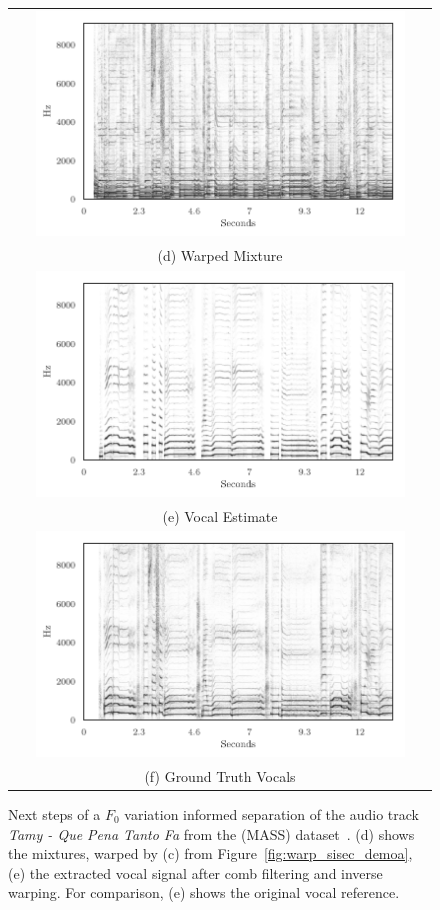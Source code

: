 \begin{figure}
  \centering
\begin{tabular}{c}
  \includegraphics[width=0.9\textwidth]{Chapters/05_Separation_Known/warp-demo/warped.pdf} \\
(d) Warped Mixture \\[6pt]
\includegraphics[width=0.9\textwidth]{Chapters/05_Separation_Known/warp-demo/Estimate.pdf} \\
(e) Vocal Estimate \\[6pt]
\includegraphics[width=0.9\textwidth]{Chapters/05_Separation_Known/warp-demo/reference.pdf} \\
(f) Ground Truth Vocals  \\[6pt]
\end{tabular}
\caption{Next steps of a $F_0$ variation informed separation of the audio track \emph{Tamy - Que Pena Tanto Fa} from the (MASS) dataset~\cite{MTGMASSdb}. (d)  shows the mixtures, warped by (c) from Figure~\ref{fig:warp_sisec_demoa}, (e) the extracted vocal signal after comb filtering and inverse warping. For comparison, (e) shows the original vocal reference.}%
\label{fig:warp_sisec_demob}
\end{figure}

